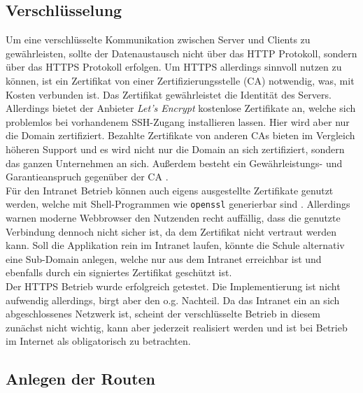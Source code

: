 \subsection{Verschlüsselung}\label{sec:encrypted}
Um eine verschlüsselte Kommunikation zwischen Server und Clients zu gewährleisten, sollte der Datenaustausch nicht über das HTTP Protokoll,  sondern über das HTTPS Protokoll erfolgen. Um HTTPS allerdings sinnvoll nutzen zu können, ist ein Zertifikat von einer Zertifizierungsstelle (CA) notwendig, was, mit Kosten verbunden ist. Das Zertifikat gewährleistet die Identität des Servers. Allerdings bietet der Anbieter \emph{Let's Encrypt} \cite{LetsEncrypt.org} kostenlose Zertifikate an, welche sich problemlos bei vorhandenem SSH-Zugang installieren lassen. Hier wird aber nur die Domain zertifiziert. Bezahlte Zertifikate von anderen CAs bieten im Vergleich höheren Support und es wird nicht nur die Domain an sich zertifiziert, sondern das ganzen Unternehmen an sich. Außerdem besteht ein Gewährleistungs- und Garantieanspruch gegenüber der CA \cite{Ali2019}. \\
Für den Intranet Betrieb können auch eigens ausgestellte Zertifikate genutzt werden, welche mit Shell-Programmen wie \texttt{openssl} generierbar sind \cite{Copes2018}. Allerdings warnen moderne Webbrowser den Nutzenden recht auffällig, dass die genutzte Verbindung dennoch nicht sicher ist, da dem Zertifikat nicht vertraut werden kann. Soll die Applikation rein im Intranet laufen, könnte die Schule alternativ eine Sub-Domain anlegen, welche nur aus dem Intranet erreichbar ist und ebenfalls durch ein signiertes Zertifikat geschützt ist. \\Der HTTPS Betrieb wurde erfolgreich getestet. Die Implementierung ist nicht aufwendig allerdings, birgt aber den o.g. Nachteil. Da das Intranet ein an sich abgeschlossenes Netzwerk ist, scheint der verschlüsselte Betrieb in diesem zunächst nicht wichtig, kann aber jederzeit realisiert werden und ist bei Betrieb im Internet als obligatorisch zu betrachten. 

\subsection{Anlegen der Routen}\label{sec:anlegrouten}

